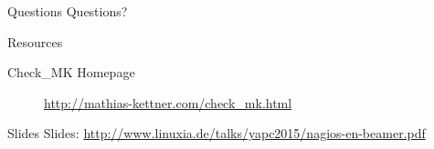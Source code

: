 \begin{frame}{Questions}
Questions?
\end{frame}

\begin{frame}[fragile]{Resources}
\begin{description}
\item[Check\_MK Homepage] \url{http://mathias-kettner.com/check_mk.html}
\end{description}
\end{frame}

\begin{frame}{Slides}
Slides:
\url{http://www.linuxia.de/talks/yapc2015/nagios-en-beamer.pdf}
\end{frame}




